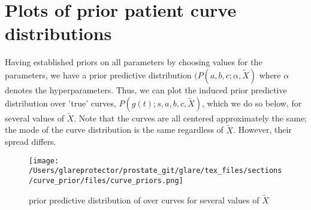 \section{Plots of prior patient curve distributions}

Having established priors on all parameters by choosing values for the parameters, we have a prior predictive distribution $(P(a,b,c;\alpha,\tilde{X})$ where $\alpha$ denotes the hyperparameters.  Thus, we can plot the induced prior predictive distribution over 'true' curves, $P(g(t);s,a,b,c,\tilde{X})$, which we do so below, for several values of $\tilde{X}$.  Note that the curves are all centered approximately the same; the mode of the curve distribution is the same regardless of $\tilde{X}$.  However, their spread differs.  

\begin{figure}
\begin{center}
\texttt{[image: /Users/glareprotector/prostate\_git/glare/tex\_files/sections/curve\_prior/files/curve\_priors.png]}
\caption{prior predictive distribution of over curves for several values of $\tilde{X}$}
\end{center}
\end{figure}
